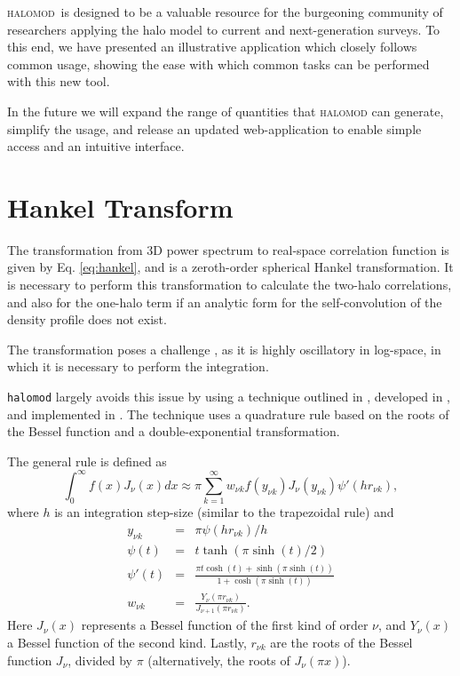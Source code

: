 \documentclass[5p]{elsarticle}
\newcommand{\halomod}{\textsc{halomod}}
\begin{document}
\halomod\  is designed to be a valuable resource for the burgeoning community of researchers applying the halo model to current and next-generation surveys. To this end, we have presented an illustrative application which closely follows common usage, showing the ease with which common tasks can be performed with this new tool.

In the future we will expand the range of quantities that \textsc{halomod} can generate, simplify the usage, and release an updated web-application to enable simple access and an intuitive interface.





\appendix

\section{Hankel Transform}
 \label{app:hankel}

The transformation from 3D power spectrum to real-space correlation function is given by Eq. \ref{eq:hankel}, and is a zeroth-order spherical Hankel transformation.
It is necessary to perform this transformation to calculate the two-halo correlations, and also for the one-halo term if an analytic form for the self-convolution of the density profile does not exist. 

The transformation poses a challenge \citep{Kwan2013,Diemer2018}, as it is highly oscillatory in log-space, in which it is necessary to perform the integration.

\verb|halomod| largely avoids this issue by using a technique outlined in \cite{Szapudi2005}, developed in \cite{Ogata2005}, and implemented in \cite{Murray2019}. 
The technique uses a quadrature rule based on the roots of the Bessel function and a double-exponential transformation. 

The general rule is defined as
\begin{equation}
	\label{eq:hankeltrans}
	\int_0^\infty f(x)J_\nu(x) dx \approx \pi \sum_{k=1}^\infty w_{\nu k} f(y_{\nu k})J_\nu(y_{\nu k})\psi'(hr_{\nu k}),
\end{equation}
where $h$ is an integration step-size (similar to the trapezoidal rule) and
\begin{eqnarray}
	y_{\nu k} &=& \pi \psi(hr_{\nu k})/h \\
	\psi(t) &=& t\tanh(\pi \sinh(t)/2) \\
	\psi'(t) &=& \frac{\pi t \cosh(t) + \sinh(\pi \sinh(t))}{ 1 + \cosh(\pi \sinh(t))} \\
	w_{\nu k} &=& \frac{Y_\nu(\pi r_{\nu k})}{J_{\nu+1}(\pi r_{\nu k})}.
\end{eqnarray}
Here $J_\nu(x)$ represents a Bessel function of the first kind of order $\nu$, and $Y_\nu(x)$ a Bessel function of the second kind. Lastly, $r_{\nu k}$ are the roots of the Bessel function $J_\nu$, divided by $\pi$ (alternatively, the roots of $J_\nu(\pi x)$).
\end{document}

